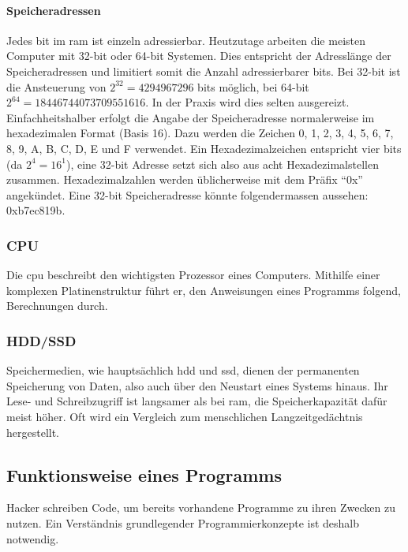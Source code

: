 \documentclass[11pt, a4paper]{article}
\begin{document}
\paragraph{Speicheradressen}
Jedes \gls{bit} im \gls{ram} ist einzeln adressierbar. Heutzutage arbeiten die meisten Computer mit 32-\gls{bit} oder 64-\gls{bit} Systemen. Dies entspricht der Adresslänge der Speicheradressen und limitiert somit die Anzahl adressierbarer \glspl{bit}. Bei 32-\gls{bit} ist die Ansteuerung von \(2^{32} = 4 294 967 296\) \glspl{bit} möglich, bei 64-\gls{bit} \(2^{64} = 18 446 744 073 709 551 616\). In der Praxis wird dies selten ausgereizt. Einfachheitshalber erfolgt die Angabe der Speicheradresse normalerweise im hexadezimalen Format (Basis 16). Dazu werden die Zeichen 0, 1, 2, 3, 4, 5, 6, 7, 8, 9, A, B, C, D, E und F verwendet. Ein Hexadezimalzeichen entspricht vier \glspl{bit} (da \(2^4 = 16^1\)), eine 32-\gls{bit} Adresse setzt sich also aus acht Hexadezimalstellen zusammen. Hexadezimalzahlen werden üblicherweise mit dem Präfix ``0x'' angekündet. Eine 32-\gls{bit} Speicheradresse könnte folgendermassen aussehen: 0xb7ec819b. \cite{BitWiki31:online}

\subsubsection{CPU}\label{subsubsec:cpu}
Die \gls{cpu} beschreibt den wichtigsten Prozessor eines Computers. Mithilfe einer komplexen Platinenstruktur führt er, den Anweisungen eines Programms folgend, Berechnungen durch. 

\subsubsection{HDD/SSD}
Speichermedien, wie hauptsächlich \gls{hdd} und \gls{ssd}, dienen der permanenten Speicherung von Daten, also auch über den Neustart eines Systems hinaus. Ihr Lese- und Schreibzugriff ist langsamer als bei \gls{ram}, die Speicherkapazität dafür meist höher. Oft wird ein Vergleich zum menschlichen Langzeitgedächtnis hergestellt. 

\subsection{Funktionsweise eines Programms}\label{subsec:funktionsweise-eines-programmes}
Hacker schreiben Code, um bereits vorhandene Programme zu ihren Zwecken zu nutzen. Ein Verständnis grundlegender Programmierkonzepte ist deshalb notwendig.
\end{document}
